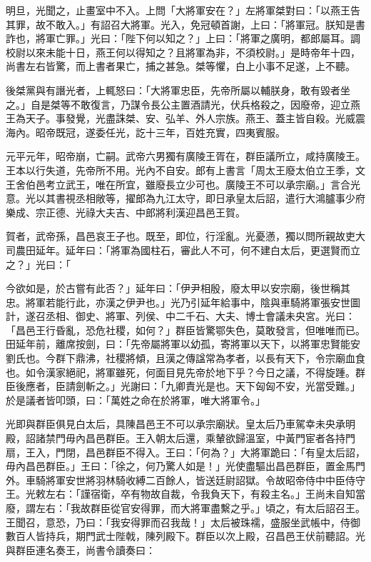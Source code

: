 \begin{pinyinscope}
明旦，光聞之，止畫室中不入。上問「大將軍安在？」左將軍桀對曰：「以燕王告其罪，故不敢入。」有詔召大將軍。光入，免冠頓首謝，上曰：「將軍冠。朕知是書詐也，將軍亡罪。」光曰：「陛下何以知之？」上曰：「將軍之廣明，都郎屬耳。調校尉以來未能十日，燕王何以得知之？且將軍為非，不須校尉。」是時帝年十四，尚書左右皆驚，而上書者果亡，捕之甚急。桀等懼，白上小事不足遂，上不聽。

後桀黨與有譖光者，上輒怒曰：「大將軍忠臣，先帝所屬以輔朕身，敢有毀者坐之。」自是桀等不敢復言，乃謀令長公主置酒請光，伏兵格殺之，因廢帝，迎立燕王為天子。事發覺，光盡誅桀、安、弘羊、外人宗族。燕王、蓋主皆自殺。光威震海內。昭帝既冠，遂委任光，訖十三年，百姓充實，四夷賓服。

元平元年，昭帝崩，亡嗣。武帝六男獨有廣陵王胥在，群臣議所立，咸持廣陵王。王本以行失道，先帝所不用。光內不自安。郎有上書言「周太王廢太伯立王季，文王舍伯邑考立武王，唯在所宜，雖廢長立少可也。廣陵王不可以承宗廟。」言合光意。光以其書視丞相敞等，擢郎為九江太守，即日承皇太后詔，遣行大鴻臚事少府樂成、宗正德、光祿大夫吉、中郎將利漢迎昌邑王賀。

賀者，武帝孫，昌邑哀王子也。既至，即位，行淫亂。光憂懣，獨以問所親故吏大司農田延年。延年曰：「將軍為國柱石，審此人不可，何不建白太后，更選賢而立之？」光曰：「

今欲如是，於古嘗有此否？」延年曰：「伊尹相殷，廢太甲以安宗廟，後世稱其忠。將軍若能行此，亦漢之伊尹也。」光乃引延年給事中，陰與車騎將軍張安世圖計，遂召丞相、御史、將軍、列侯、中二千石、大夫、博士會議未央宮。光曰：「昌邑王行昏亂，恐危社稷，如何？」群臣皆驚鄂失色，莫敢發言，但唯唯而已。田延年前，離席按劍，曰：「先帝屬將軍以幼孤，寄將軍以天下，以將軍忠賢能安劉氏也。今群下鼎沸，社稷將傾，且漢之傳諡常為孝者，以長有天下，令宗廟血食也。如令漢家絕祀，將軍雖死，何面目見先帝於地下乎？今日之議，不得旋踵。群臣後應者，臣請劍斬之。」光謝曰：「九卿責光是也。天下匈匈不安，光當受難。」於是議者皆叩頭，曰：「萬姓之命在於將軍，唯大將軍令。」

光即與群臣俱見白太后，具陳昌邑王不可以承宗廟狀。皇太后乃車駕幸未央承明殿，詔諸禁門毋內昌邑群臣。王入朝太后還，乘輦欲歸溫室，中黃門宦者各持門扇，王入，門閉，昌邑群臣不得入。王曰：「何為？」大將軍跪曰：「有皇太后詔，毋內昌邑群臣。」王曰：「徐之，何乃驚人如是！」光使盡驅出昌邑群臣，置金馬門外。車騎將軍安世將羽林騎收縛二百餘人，皆送廷尉詔獄。令故昭帝侍中中臣侍守王。光敕左右：「謹宿衛，卒有物故自裁，令我負天下，有殺主名。」王尚未自知當廢，謂左右：「我故群臣從官安得罪，而大將軍盡繫之乎。」頃之，有太后詔召王。王聞召，意恐，乃曰：「我安得罪而召我哉！」太后被珠襦，盛服坐武帳中，侍御數百人皆持兵，期門武士陛戟，陳列殿下。群臣以次上殿，召昌邑王伏前聽詔。光與群臣連名奏王，尚書令讀奏曰：


\end{pinyinscope}

